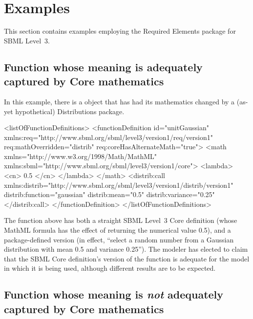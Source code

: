 
\section{Examples}
\label{examples}

This section contains examples employing the Required Elements package for SBML Level~3.

\subsection{Function whose meaning is adequately captured by Core mathematics}

In this example, there is a \FunctionDefinition object that has had its mathematics changed by a (as-yet hypothetical) Distributions package.

\begin{example}
<listOfFunctionDefinitions> 
    <functionDefinition id="unitGaussian" 
                        xmlns:req="http://www.sbml.org/sbml/level3/version1/req/version1"
                        req:mathOverridden="distrib" req:coreHasAlternateMath="true"> 
        <math xmlns="http://www.w3.org/1998/Math/MathML" 
              xmlns:sbml="http://www.sbml.org/sbml/level3/version1/core"> 
             <lambda>
                 <cn> 0.5 </cn>
             </lambda>
        </math> 
        <distrib:call xmlns:distrib="http://www.sbml.org/sbml/level3/version1/distrib/version1"
                      distrib:function="gaussian" distrib:mean="0.5" distrib:variance="0.25"
        </distrib:call> 
    </functionDefinition> 
</listOfFunctionDefinitions> 
\end{example}

The function  above has both a straight SBML Level~3 Core definition (whose MathML formula has the effect of returning the numerical value 0.5), and a package-defined version (in effect, ``select a random number from a Gaussian distribution with mean 0.5 and variance 0.25''). The modeler has elected to claim that the SBML Core definition's version of the function is adequate for the model in which it is being used, although different results are to be expected.


\subsection{Function whose meaning is \emph{not} adequately captured by Core mathematics}

